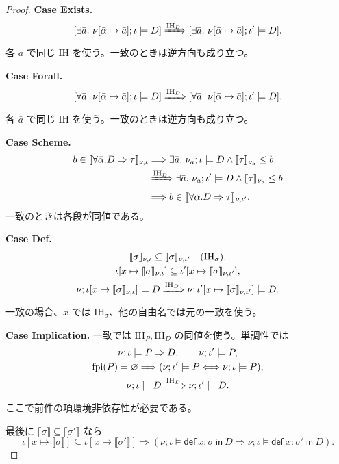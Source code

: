 \documentclass[a4paper,11pt]{article}
\theoremstyle{definition}
\newenvironment{Case}[1]{\par\smallskip\noindent\textbf{Case #1.}\enspace\ignorespaces}{\par}
\newcommand{\FPI}{\operatorname{fpi}}
\newcommand{\emp}{\varnothing}
\newcommand{\den}[1]{\llbracket #1\rrbracket}
\newcommand{\Def}[3]{\mathsf{def}\ #1:#2\ \mathsf{in}\ #3}
\begin{document}
\begin{proof}
\begin{Case}{Exists}
\[
 [\exists\bar a.\ \nu[\bar\alpha\mapsto\bar a];\iota\models D]
 \xRightarrow{\mathrm{IH}_D}
 [\exists\bar a.\ \nu[\bar\alpha\mapsto\bar a];\iota'\models D].
\]
各 $\bar a$ で同じ IH を使う。一致のときは逆方向も成り立つ。
\end{Case}

\begin{Case}{Forall}
\[
 [\forall\bar a.\ \nu[\bar\alpha\mapsto\bar a];\iota\models D]
 \xRightarrow{\mathrm{IH}_D}
 [\forall\bar a.\ \nu[\bar\alpha\mapsto\bar a];\iota'\models D].
\]
各 $\bar a$ で同じ IH を使う。一致のときは逆方向も成り立つ。
\end{Case}

\begin{Case}{Scheme}
\begin{align*}
 b\in\den{\forall\bar\alpha.D\Rightarrow\tau}_{\nu,\iota}
 &\Longrightarrow\exists\bar a.\ \nu_a;\iota\models D\land\den\tau_{\nu_a}\leq b\\
 &\xRightarrow{\mathrm{IH}_D}\exists\bar a.\ \nu_a;\iota'\models D\land\den\tau_{\nu_a}\leq b\\
 &\Longrightarrow b\in\den{\forall\bar\alpha.D\Rightarrow\tau}_{\nu,\iota'}.
\end{align*}
一致のときは各段が同値である。
\end{Case}

\begin{Case}{Def}
\begin{gather*}
 \den\sigma_{\nu,\iota}\subseteq\den\sigma_{\nu,\iota'}\quad(\mathrm{IH}_\sigma),\\
 \iota[x\mapsto\den\sigma_{\nu,\iota}]
 \subseteq\iota'[x\mapsto\den\sigma_{\nu,\iota'}],\\
 \nu;\iota[x\mapsto\den\sigma_{\nu,\iota}]\models D
 \xRightarrow{\mathrm{IH}_D}
 \nu;\iota'[x\mapsto\den\sigma_{\nu,\iota'}]\models D.
\end{gather*}
一致の場合、$x$ では $\mathrm{IH}_\sigma$、他の自由名では元の一致を使う。
\end{Case}

\begin{Case}{Implication}
一致では $\mathrm{IH}_P,\mathrm{IH}_D$ の同値を使う。単調性では
\begin{gather*}
 \nu;\iota\models P\Rightarrow D,\qquad\nu;\iota'\models P,\\
 \FPI(P)=\emp\Longrightarrow(\nu;\iota'\models P\Longleftrightarrow\nu;\iota\models P),\\
 \nu;\iota\models D\xRightarrow{\mathrm{IH}_D}\nu;\iota'\models D.
\end{gather*}
ここで前件の項環境非依存性が必要である。
\end{Case}
最後に $\den\sigma\subseteq\den{\sigma'}$ なら
\[
 \iota[x\mapsto\den\sigma]\subseteq\iota[x\mapsto\den{\sigma'}]
 \Longrightarrow(\nu;\iota\models\Def x\sigma D
                 \Rightarrow\nu;\iota\models\Def x{\sigma'}D).
\]
\end{proof}
\end{document}
